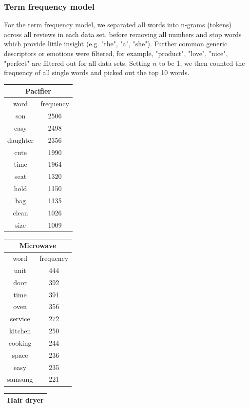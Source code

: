 \documentclass[reqno]{article}
\theoremstyle{definition}
\theoremstyle{definition}
\theoremstyle{remark}
\begin{document}
\subsubsection{Term frequency model}
For the term frequency model, we separated all words into n-grams (tokens) across all reviews in each data set, before removing all numbers and stop words which provide little insight (e.g. "the", "a", "she"). Further common generic descriptors or emotions were filtered, for example, "product", "love", "nice", "perfect" are filtered out for all data sets. Setting $n$ to be 1, we then counted the frequency of all single words and picked out the top 10 words.
\begin{center}
\begin{tabular}{|c|c|} 
 \hline
 \multicolumn{2}{|c|}{Pacifier} \\
 \hline
 word & frequency \\
  \hline
 son & 2506 \\ 
 easy & 2498 \\ 
 daughter & 2356 \\
 cute & 1990 \\
 time  & 1964\\
 seat & 1320\\
 hold & 1150\\
 bag & 1135\\
 clean & 1026\\
 size & 1009\\
 \hline
\end{tabular}
\begin{tabular}{|c|c|} 
 \hline
 \multicolumn{2}{|c|}{Microwave} \\
 \hline
 word & frequency \\ 
 \hline
 unit    &   444 \\
 door   &    392 \\
 time    &   391 \\
 oven   &    356\\ 
 service   & 272\\
 kitchen  &  250\\
 cooking  &  244\\
 space   &   236\\
 easy  &     235\\
 samsung  &  221\\
 \hline
\end{tabular}
\begin{tabular}{|c|c|} 
 \hline
 \multicolumn{2}{|c|}{Hair dryer} \\
 \hline

\end{tabular}
\end{center}
\end{document}
